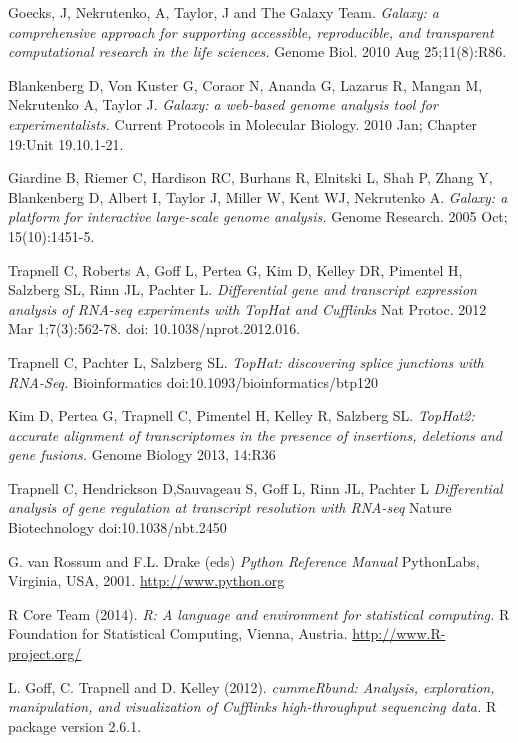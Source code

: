 \documentclass[a4paper,10pt]{article}
\begin{document}

\begin{thebibliography}{10}

 Goecks, J, Nekrutenko, A, Taylor, J and The Galaxy Team. 
{\em Galaxy: a comprehensive approach for supporting accessible, reproducible, and transparent computational research in the life sciences.}
Genome Biol. 2010 Aug 25;11(8):R86.

 Blankenberg D, Von Kuster G, Coraor N, Ananda G, Lazarus R, Mangan M, Nekrutenko A, Taylor J. 
{\em Galaxy: a web-based genome analysis tool for experimentalists.}
Current Protocols in Molecular Biology. 2010 Jan; Chapter 19:Unit 19.10.1-21.

 Giardine B, Riemer C, Hardison RC, Burhans R, Elnitski L, Shah P, Zhang Y, Blankenberg D, Albert I, Taylor J, Miller W, Kent WJ, Nekrutenko A.
{\em Galaxy: a platform for interactive large-scale genome analysis.}
Genome Research. 2005 Oct; 15(10):1451-5.

 Trapnell C, Roberts A, Goff L, Pertea G, Kim D, Kelley DR, Pimentel H, Salzberg SL, Rinn JL, Pachter L. 
{\em Differential gene and transcript expression analysis of RNA-seq experiments with TopHat and Cufflinks}
Nat Protoc. 2012 Mar 1;7(3):562-78. doi: 10.1038/nprot.2012.016.

 Trapnell C, Pachter L, Salzberg SL. 
{\em TopHat: discovering splice junctions with RNA-Seq.}
Bioinformatics doi:10.1093/bioinformatics/btp120

 Kim D, Pertea G, Trapnell C, Pimentel H, Kelley R, Salzberg SL.
{\em TopHat2: accurate alignment of transcriptomes in the presence of insertions, deletions and gene fusions.}
Genome Biology 2013, 14:R36

 Trapnell C, Hendrickson D,Sauvageau S, Goff L, Rinn JL, Pachter L 
{\em Differential analysis of gene regulation at transcript resolution with RNA-seq}
Nature Biotechnology doi:10.1038/nbt.2450

 G. van Rossum and F.L. Drake (eds)
{\em Python Reference Manual}
PythonLabs, Virginia, USA, 2001. 
\href{http://www.python.org}{http://www.python.org}

 R Core Team (2014).
{\em R: A language and environment for statistical computing.}
R Foundation for Statistical Computing, Vienna, Austria.
\href{http://www.R-project.org/}{http://www.R-project.org/}

 L. Goff, C. Trapnell and D. Kelley (2012).
{\em cummeRbund: Analysis, exploration, manipulation, and visualization of Cufflinks high-throughput sequencing data.}
R package version 2.6.1.

\end{thebibliography}
\end{document}
